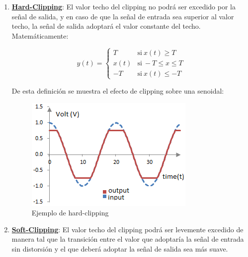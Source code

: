 \documentclass[../../main.tex]{subfiles}
\begin{document}
\begin{enumerate}

\item \underline{\textbf{Hard-Clipping}}: El valor techo del clipping no podrá ser excedido por la señal de salida, y en caso de que la señal de entrada sea superior al valor techo, la señal de salida adoptará el valor constante del techo. Matemáticamente: \par
	 \begin{equation}
  	   y(t) = \left\{
	  	    \begin{array}{ll}
		 					T      & \mathrm{si\ } x(t) \ge T \\
			 				x(t) & \mathrm{si\ } -T \le x \le T \\
			 				-T     & \mathrm{si\ } x(t) \le -T
	     	 \end{array}
	     	\right.
 	\end{equation}
\par
De esta definición se muestra el efecto de clipping sobre una senoidal:

\begin{figure}[H]	%
	\centering
	\includegraphics[scale=1]{imagenes/hard_clipping_grafico_tipico.png}
	\caption{Ejemplo de hard-clipping}
	\label{fig:ej5_hard_clipping_grafico_tipico}
\end{figure}

\item \underline{\textbf{Soft-Clipping}}: El valor techo del clipping podrá ser levemente excedido de manera tal que la transición entre el valor que adoptaría la señal de entrada sin distorsión y el que deberá adoptar la señal de salida sea más suave.\par


\end{enumerate}
\end{document}
